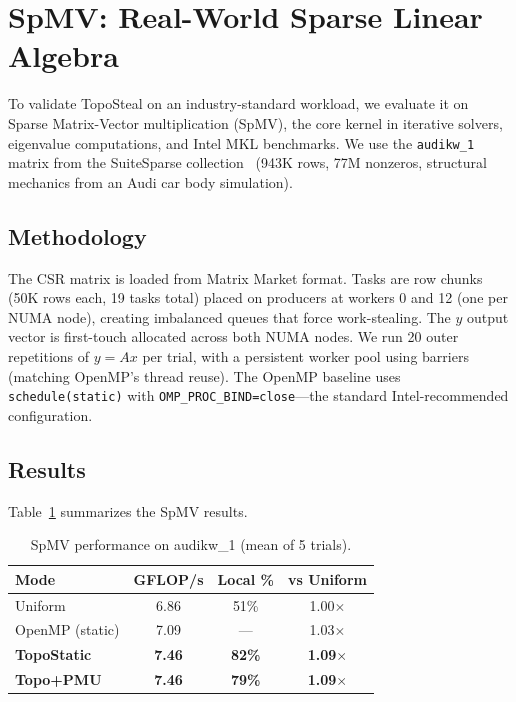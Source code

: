\documentclass[conference]{IEEEtran}
\begin{document}
\section{SpMV: Real-World Sparse Linear Algebra}

To validate TopoSteal on an industry-standard workload, we evaluate it on Sparse Matrix-Vector multiplication (SpMV), the core kernel in iterative solvers, eigenvalue computations, and Intel MKL benchmarks. We use the \texttt{audikw\_1} matrix from the SuiteSparse collection~\cite{suitesparse} (943K rows, 77M nonzeros, structural mechanics from an Audi car body simulation).

\subsection{Methodology}

The CSR matrix is loaded from Matrix Market format. Tasks are row chunks (50K rows each, 19 tasks total) placed on producers at workers 0 and 12 (one per NUMA node), creating imbalanced queues that force work-stealing. The $y$ output vector is first-touch allocated across both NUMA nodes. We run 20 outer repetitions of $y = Ax$ per trial, with a persistent worker pool using barriers (matching OpenMP's thread reuse). The OpenMP baseline uses \texttt{schedule(static)} with \texttt{OMP\_PROC\_BIND=close}---the standard Intel-recommended configuration.

\subsection{Results}

Table~\ref{tab:spmv} summarizes the SpMV results.

\begin{table}[h]
\centering
\caption{SpMV performance on audikw\_1 (mean of 5 trials).}
\small
\begin{tabular}{lccc}
\toprule
\textbf{Mode} & \textbf{GFLOP/s} & \textbf{Local \%} & \textbf{vs Uniform} \\
\midrule
Uniform             & 6.86 & 51\% & 1.00$\times$ \\
OpenMP (static)     & 7.09 & ---  & 1.03$\times$ \\
\textbf{TopoStatic} & \textbf{7.46} & \textbf{82\%} & \textbf{1.09$\times$} \\
\textbf{Topo+PMU}   & \textbf{7.46} & \textbf{79\%} & \textbf{1.09$\times$} \\
\bottomrule
\end{tabular}
\label{tab:spmv}
\end{table}
\end{document}
